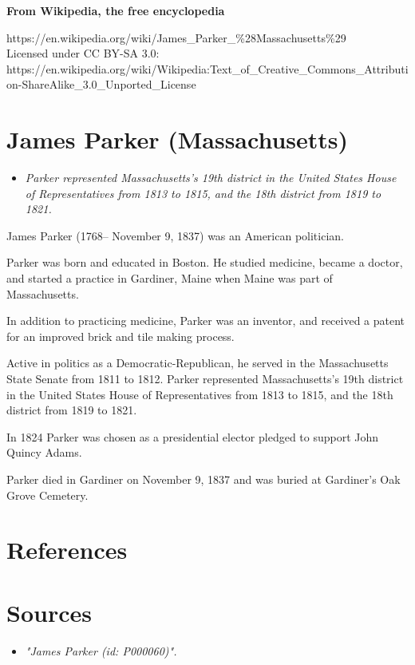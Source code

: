 \textbf{From Wikipedia, the free encyclopedia}

https://en.wikipedia.org/wiki/James\_Parker\_\%28Massachusetts\%29\\
Licensed under CC BY-SA 3.0:\\
https://en.wikipedia.org/wiki/Wikipedia:Text\_of\_Creative\_Commons\_Attribution-ShareAlike\_3.0\_Unported\_License

\section{James Parker (Massachusetts)}\label{james-parker-massachusetts}

\begin{itemize}
\item
  \emph{Parker represented Massachusetts's 19th district in the United
  States House of Representatives from 1813 to 1815, and the 18th
  district from 1819 to 1821.}
\end{itemize}

James Parker (1768-- November 9, 1837) was an American politician.

Parker was born and educated in Boston. He studied medicine, became a
doctor, and started a practice in Gardiner, Maine when Maine was part of
Massachusetts.

In addition to practicing medicine, Parker was an inventor, and received
a patent for an improved brick and tile making process.

Active in politics as a Democratic-Republican, he served in the
Massachusetts State Senate from 1811 to 1812. Parker represented
Massachusetts's 19th district in the United States House of
Representatives from 1813 to 1815, and the 18th district from 1819 to
1821.

In 1824 Parker was chosen as a presidential elector pledged to support
John Quincy Adams.

Parker died in Gardiner on November 9, 1837 and was buried at Gardiner's
Oak Grove Cemetery.

\section{References}\label{references}

\section{Sources}\label{sources}

\begin{itemize}
\item
  \emph{"James Parker (id: P000060)".}
\end{itemize}

